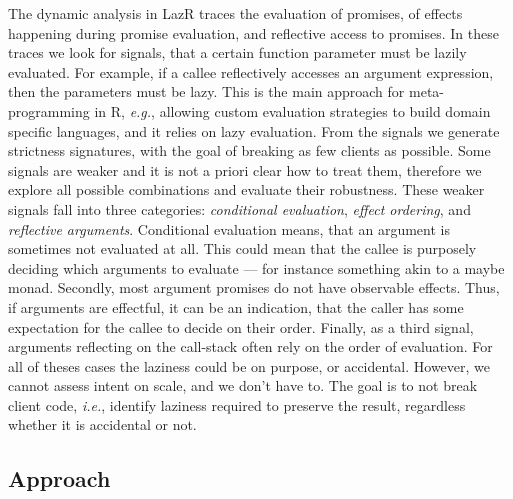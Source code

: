\documentclass[review,nonacm,screen,acmsmall,anonymous=true]{acmart}
\newcommand{\lazr}{{\sf LazR}\xspace}
\newcommand{\eg}{\emph{e.g.},\xspace}
\newcommand{\ie}{\emph{i.e.},\xspace}
\begin{document}
The dynamic analysis in \lazr traces the evaluation of promises, of effects
happening during promise evaluation, and reflective access to promises. In these
traces we look for signals, that a certain function parameter must be lazily
evaluated. For example, if a callee reflectively accesses an argument
expression, then the parameters must be lazy. This is the main approach for
meta-programming in R, \eg allowing custom evaluation strategies to build domain
specific languages, and it relies on lazy evaluation. From the signals we
generate strictness signatures, with the goal of breaking as few clients as
possible. Some signals are weaker and it is not a priori clear how to treat
them, therefore we explore all possible combinations and evaluate their
robustness. These weaker signals fall into three categories: \emph{conditional
evaluation}, \emph{effect ordering}, and \emph{reflective arguments}.
Conditional evaluation means, that an argument is sometimes not evaluated at
all. This could mean that the callee is purposely deciding which arguments to
evaluate --- for instance something akin to a maybe monad. Secondly, most
argument promises do not have observable effects. Thus, if arguments are
effectful, it can be an indication, that the caller has some expectation for the
callee to decide on their order. Finally, as a third signal, arguments
reflecting on the call-stack often rely on the order of evaluation. For all of
theses cases the laziness could be on purpose, or accidental. However, we cannot
assess intent on scale, and we don't have to. The goal is to not break client
code, \ie identify laziness required to preserve the result, regardless whether
it is accidental or not.

\subsection{Approach}
\end{document}
